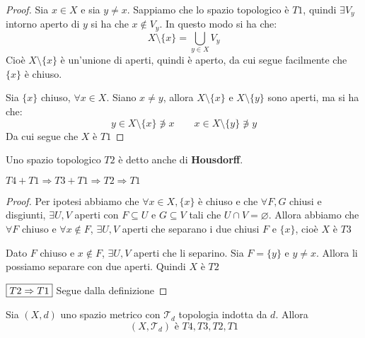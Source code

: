 \documentclass[11pt,a4paper,twoside]{article}
\theoremstyle{definition}
\begin{document}
\begin{proof}
	\fbox{$\Rightarrow$} Sia $x \in X$ e sia $y \neq x$. Sappiamo che lo spazio topologico è $T1$, quindi $\exists V_y$ intorno aperto di $y$ si ha che $x \not \in V_y$. In questo modo si ha che:
	\[ X\setminus \{x\} = \bigcup_{y \in X}V_y \]
	Cioè $X\setminus \{x\}$ è un'unione di aperti, quindi è aperto, da cui segue facilmente che $\{x\}$ è chiuso.

	\fbox{$\Leftarrow$} Sia $\{x\}$ chiuso, $\forall x \in X$. Siano $x \neq y$, allora $X\setminus \{x\}$ e $X \setminus \{y\}$ sono aperti, ma si ha che:
	\[ y \in X\setminus\{x\} \not \ni x \qquad x \in X\setminus \{y\} \not \ni y\]
	Da cui segue che $X$ è $T1$
\end{proof}

Uno spazio topologico $T2$ è detto anche di \textbf{Housdorff}.

\begin{prop}{}{}
	$T4 + T1 \Rightarrow T3 + T1 \Rightarrow T2 \Rightarrow T1$
\end{prop}

\begin{proof}
	 Per ipotesi abbiamo che $\forall x \in X, \{x\}$ è chiuso e che $\forall F,G$ chiusi e disgiunti, $\exists U,V$ aperti con $F \subseteq U$ e $G \subseteq V$ tali che $U \cap V = \varnothing$. Allora abbiamo che $\forall F$ chiuso e $\forall x \not \in F$, $\exists U,V$ aperti che separano i due chiusi $F$ e $\{x\}$, cioè $X$ è $T3$

	 Dato $F$ chiuso e $x \notin F$, $\exists U,V$ aperti che li separino. Sia $F = \{y\}$ e $y \neq x$. Allora li possiamo separare con due aperti. Quindi $X$ è $T2$

	$\fbox{$T2 \Rightarrow T1$}$ Segue dalla definizione
\end{proof}

\begin{prop}{}{}
	Sia $(X, d)$ uno spazio metrico con $\mathcal T_d$ topologia indotta da $d$. Allora \[ (X, \mathcal T_d)\text{ è }T4,T3,T2,T1 \]
\end{prop}
\end{document}
